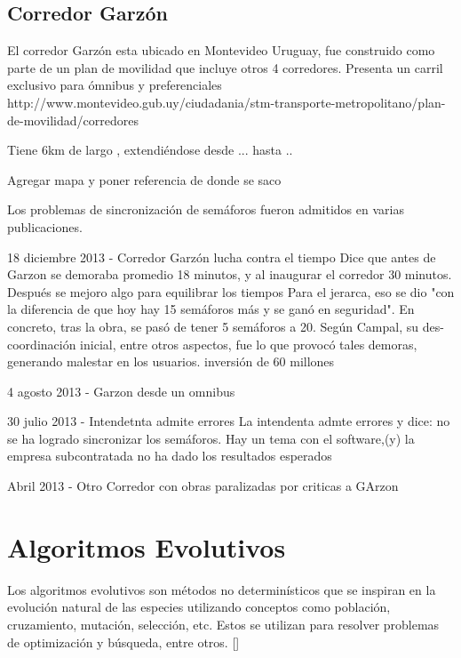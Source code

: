 \subsection{Corredor Garzón}
El corredor Garzón esta ubicado en Montevideo Uruguay, fue construido como parte de un plan de movilidad que incluye otros 4 corredores. 
Presenta un carril exclusivo para ómnibus y preferenciales
http://www.montevideo.gub.uy/ciudadania/stm-transporte-metropolitano/plan-de-movilidad/corredores

Tiene 6km de largo , extendiéndose desde ...  hasta ..

Agregar mapa y poner referencia de donde se saco

Los problemas de sincronización de semáforos fueron admitidos en varias publicaciones.

18 diciembre 2013 - Corredor Garzón lucha contra el tiempo %
Dice que antes de Garzon se demoraba promedio 18 minutos, y al inaugurar el corredor 30 minutos. Después se mejoro algo para equilibrar los tiempos
Para el jerarca, eso se dio "con la diferencia de que hoy hay 15 semáforos más y se ganó en seguridad". En concreto, tras la obra, se pasó de tener 5 semáforos a 20. Según Campal, su des-coordinación inicial, entre otros aspectos, fue lo que provocó tales demoras, generando malestar en los usuarios.
inversión de 60 millones


4 agosto 2013 - Garzon desde un omnibus %


30 julio 2013  - Intendetnta admite errores %
La intendenta admte errores y dice: no se ha logrado sincronizar los semáforos. Hay un tema con el software,(y) la empresa subcontratada no ha dado los resultados esperados


Abril 2013 - Otro Corredor con obras paralizadas por criticas a GArzon





\section{Algoritmos Evolutivos}
Los algoritmos evolutivos son métodos no determinísticos que se inspiran en la evolución natural de las especies utilizando conceptos como población, cruzamiento, mutación, selección, etc. Estos se utilizan para resolver problemas de optimización y búsqueda, entre otros. []

